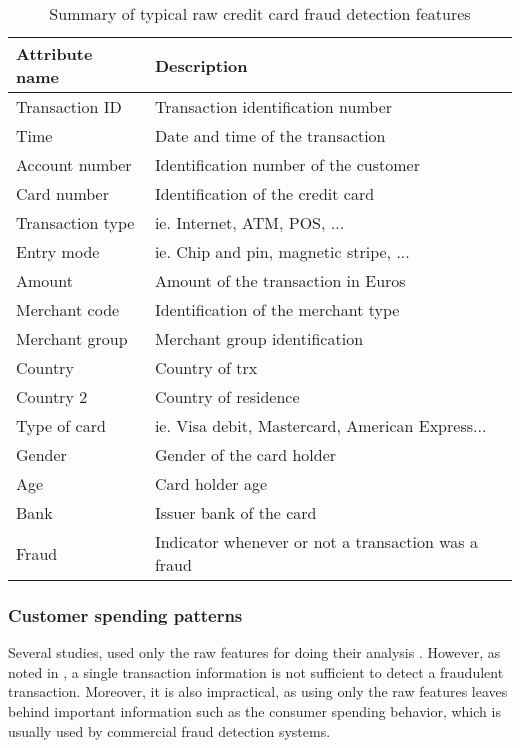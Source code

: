 	\begin{table}[!t]
   \caption{Summary of typical raw credit card fraud detection features}
   \label{tab:raw_features}
   \centering
   \begin{tabular}{l l}
   \hline
   \textbf{Attribute name} & \textbf{Description}\\
   \hline
		Transaction ID & Transaction identification number \\
   Time & Date and time of the transaction\\
   Account number & Identification number of the customer\\
   Card number & Identification of the credit card\\
   Transaction type & ie. Internet, ATM, POS, ...\\
	 Entry mode & ie. Chip and pin, magnetic stripe, ...\\
   Amount & Amount of the transaction in Euros\\
   Merchant code & Identification of the merchant type\\
   Merchant group & Merchant group identification\\
   Country & Country of trx\\
   Country 2 & Country of residence \\
   Type of card & ie. Visa debit, Mastercard, American Express...\\
   Gender & Gender of the card holder\\
   Age & Card holder age\\
   Bank & Issuer bank of the card\\
   Fraud & Indicator whenever or not a transaction was a fraud\\
   \hline
   \end{tabular}
   \end{table}
	
	\subsubsection{Customer spending patterns}
	\label{sec:4:frad:features_agg}
	
	Several studies, used only the raw features for doing their analysis 
	\citep{Brause1999a,Minegishi2011,Panigrahi2009,Sanchez2009}. However, as noted in 
	\citep{Bolton2001}, a single transaction information is not sufficient to detect a fraudulent 
	transaction. Moreover, it is also impractical, as using only the raw features leaves behind 
	important information such as the consumer spending behavior, which is usually used by commercial 
	fraud detection systems.
	
